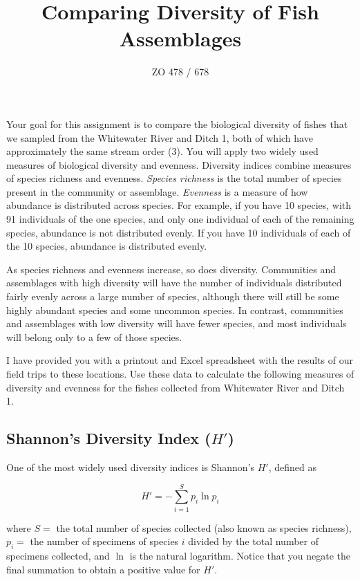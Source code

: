 \documentclass[11pt]{article}
\title{Comparing Diversity of Fish Assemblages}
\author{ZO 478 / 678}
\date{}                                           %
\begin{document}
\maketitle

Your goal for this assignment is to compare the biological diversity of fishes that we sampled from the Whitewater River and Ditch 1, both of which have approximately the same stream order (3).  You will apply two widely used measures of biological diversity and evenness. Diversity indices combine measures of species richness and evenness.  \emph{Species richness} is the total number of species present in the community or assemblage.  \emph{Evenness} is a measure of how abundance is distributed across species.  For example, if you have 10 species, with 91 individuals of the one species, and only one individual of each of the remaining species, abundance is not distributed evenly.  If you have 10 individuals of each of the 10 species, abundance is distributed evenly. 

As species richness and evenness increase, so does diversity.  Communities and assemblages with high diversity will have the number of individuals distributed fairly evenly across a large number of species, although there will still be some highly abundant species and some uncommon species.  In contrast, communities and assemblages with low diversity will have fewer species, and most individuals will belong only to a few of those species.

I have provided you with a printout and Excel spreadsheet with the results of our field trips to these locations.  Use these data to calculate the following measures of diversity and evenness for the fishes collected from Whitewater River and Ditch 1. 

\subsection*{Shannon's Diversity Index ($H'$)}

One of the most widely used diversity indices is Shannon's $H'$, defined as 

\begin{equation*}
H' = -\sum_{i=1}^{S} p_i \ln p_i
\end{equation*}

\noindent where $S = $ the total number of species collected (also known as species richness), $p_i = $ the number of specimens of species $i$ divided by the total number of specimens collected, and $\ln$ is the natural logarithm. Notice that you negate the final summation to obtain a positive value for $H'$.
\end{document}
